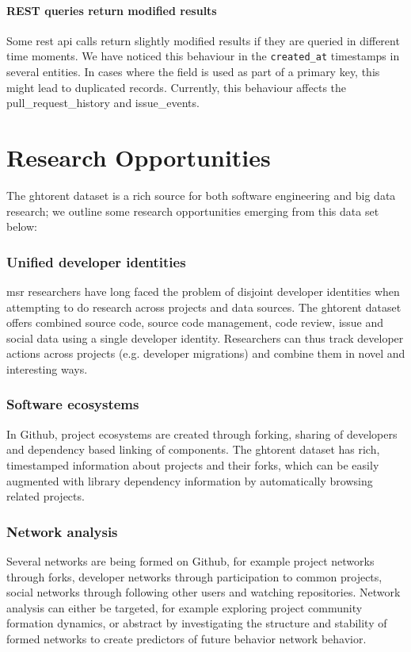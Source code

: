 \documentclass[conference,letter]{IEEEtran}
\begin{document}
\paragraph*{REST queries return modified results} Some {\sc rest api} calls
return slightly modified results if they are queried in different time 
moments. We have noticed this behaviour in the \texttt{created\_at} 
timestamps in several entities. In cases where the field is used as part
of a primary key, this might lead to duplicated records. Currently, this 
behaviour affects the \textsf{pull\_request\_history} and
\textsf{issue\_events}.

\section{Research Opportunities}

The {\sc ght}orent dataset is a rich source for both software engineering and
big data research; we outline some research opportunities emerging from
this data set below:

\subsubsection{Unified developer identities} {\sc msr} researchers have long
faced the
problem of disjoint developer identities when attempting to do research across
projects and data sources. The {\sc ght}orent dataset offers
combined source code, source code management, code review, issue and social
data using a single developer identity. Researchers can thus track developer
actions across projects (e.g. developer migrations) and combine them in 
novel and interesting ways. 

\subsubsection{Software ecosystems} In Github, project ecosystems are created
through forking, sharing of developers and dependency based linking of
components. The {\sc ght}orent dataset has rich, timestamped information about 
projects and their forks, which can be easily augmented with library
dependency information by automatically browsing related projects.

\subsubsection{Network analysis} Several networks are being formed on
Github, for example project networks through forks, developer networks
through participation to common projects, social networks through following
other users and watching repositories. Network analysis can either
be targeted, for example exploring project community formation dynamics, or
abstract by investigating the structure and stability of formed networks to
create predictors of future behavior network behavior.
\end{document}

